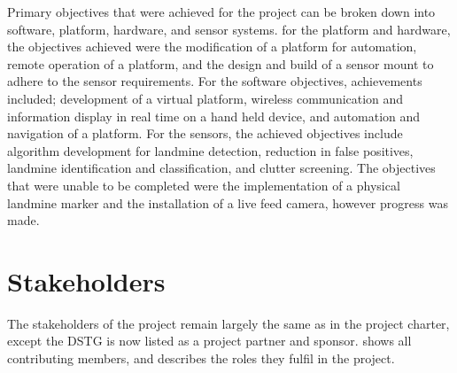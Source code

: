 \documentclass[main.tex]{subfiles}
\begin{document}
Primary objectives that were achieved for the project can be broken down into software, platform, hardware, and sensor systems. for the platform and hardware, the objectives achieved were the modification of a platform for automation, remote operation of a platform, and the design and build of a sensor mount to adhere to the sensor requirements. For the software objectives, achievements included; development of a virtual platform, wireless communication and information display in real time on a hand held device, and automation and navigation of a platform. For the sensors, the achieved objectives include algorithm development for landmine detection, reduction in false positives, landmine identification and classification, and clutter screening. The objectives that were unable to be completed were the implementation of a physical landmine marker and the installation of a live feed camera, however progress was made.


\section{Stakeholders}

The stakeholders of the project remain largely the same as in the project charter, except the DSTG is now listed as a project partner and sponsor.  shows all contributing members, and describes the roles they fulfil in the project.  
\end{document}
